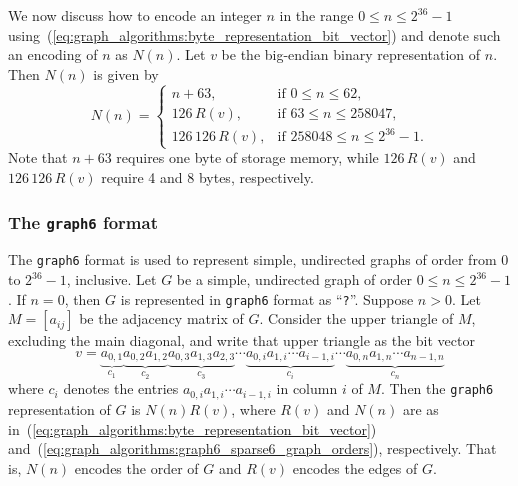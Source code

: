 We now discuss how to encode an integer $n$ in the range
$0 \leq n \leq 2^{36} - 1$
using~(\ref{eq:graph_algorithms:byte_representation_bit_vector}) and
denote such an encoding of $n$ as $N(n)$. Let $v$ be the big-endian
binary representation of $n$. Then $N(n)$ is given by
%
\begin{equation}
\label{eq:graph_algorithms:graph6_sparse6_graph_orders}
N(n)
=
\begin{cases}
n + 63, & \text{if $0 \leq n \leq 62$}, \\
126 \, R(v), & \text{if $63 \leq n \leq 258047$}, \\
126 \, 126 \, R(v), & \text{if $258048 \leq n \leq 2^{36}-1$}.
\end{cases}
\end{equation}
Note that $n + 63$ requires one byte of storage memory, while
$126 \, R(v)$ and $126 \, 126 \, R(v)$ require 4 and 8 bytes,
respectively.



\subsubsection{The {\tt graph6} format}

The {\tt graph6} format is used to represent simple, undirected graphs of
order from $0$ to $2^{36} - 1$, inclusive. Let $G$ be a simple,
undirected graph of order $0 \leq n \leq 2^{36} - 1$. If $n = 0$, then
$G$ is represented in {\tt graph6} format as ``\verb!?!''. Suppose $n >
0$. Let $M = [a_{ij}]$ be the adjacency matrix of $G$. Consider the
upper triangle of $M$, excluding the main diagonal, and write that
upper triangle as the bit vector
\[
v
=
\underbrace{a_{0,1}}_{c_1}
\underbrace{a_{0,2} a_{1,2}}_{c_2}
\underbrace{a_{0,3} a_{1,3} a_{2,3}}_{c_3} \cdots
\underbrace{a_{0,i} a_{1,i} \cdots a_{i-1,i}}_{c_i} \cdots
\underbrace{a_{0,n} a_{1,n} \cdots a_{n-1,n}}_{c_n}
\]
where $c_i$ denotes the entries $a_{0,i} a_{1,i} \cdots a_{i-1,i}$ in
column $i$ of $M$. Then the {\tt graph6} representation of $G$ is
$N(n) R(v)$, where $R(v)$ and $N(n)$ are as
in~(\ref{eq:graph_algorithms:byte_representation_bit_vector})
and~(\ref{eq:graph_algorithms:graph6_sparse6_graph_orders}),
respectively. That is, $N(n)$ encodes the order of $G$ and $R(v)$
encodes the edges of $G$.


